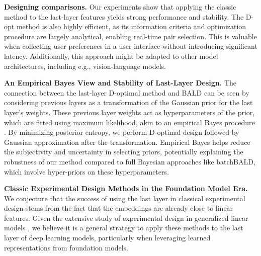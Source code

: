 \textbf{Designing comparisons.} Our experiments show that applying the classic method to the last-layer features yields strong performance and stability. The D-opt method is also highly efficient, as its information criteria and optimization procedure are largely analytical, enabling real-time pair selection. This is valuable when collecting user preferences in a user interface without introducing significant latency. Additionally, this approach might be adapted to other model architectures, including e.g., vision-language models.

\textbf{An Empirical Bayes View and Stability of Last-Layer Design.} The connection between the last-layer D-optimal method and BALD can be seen by considering previous layers as a transformation of the Gaussian prior for the last layer's weights. These previous layer weights act as hyperparameters of the prior, which are fitted using maximum likelihood, akin to an empirical Bayes procedure \citep{deely1981bayes}. By minimizing posterior entropy, we perform D-optimal design followed by Gaussian approximation after the transformation. Empirical Bayes helps reduce the subjectivity and uncertainty in selecting priors, potentially explaining the robustness of our method compared to full Bayesian approaches like batchBALD, which involve hyper-priors on these hyperparameters. 



\textbf{Classic Experimental Design Methods in the Foundation Model Era.} We conjecture that the success of using the last layer in classical experimental design stems from the fact that the embeddings are already close to linear features. Given the extensive study of experimental design in generalized linear models \citep[see e.g.,][]{atkinson2007optimum, pukelsheim2006optimal}, we believe it is a general strategy to apply these methods to the last layer of deep learning models, particularly when leveraging learned representations from foundation models.


